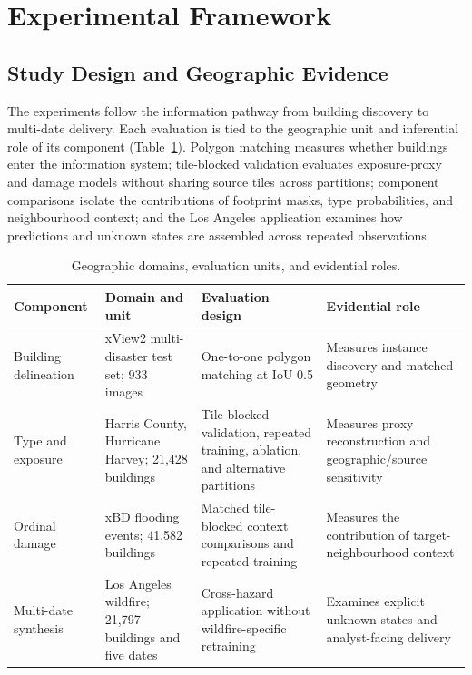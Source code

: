 \section{Experimental Framework}
\label{sec:experiments}

\subsection{Study Design and Geographic Evidence}
\label{sec:exp_scope}

The experiments follow the information pathway from building discovery to multi-date delivery. Each evaluation is tied to the geographic unit and inferential role of its component (Table~\ref{tab:evidence_scope}). Polygon matching measures whether buildings enter the information system; tile-blocked validation evaluates exposure-proxy and damage models without sharing source tiles across partitions; component comparisons isolate the contributions of footprint masks, type probabilities, and neighbourhood context; and the Los Angeles application examines how predictions and unknown states are assembled across repeated observations.

\begin{table}[h!]
\centering
\caption{Geographic domains, evaluation units, and evidential roles.}
\label{tab:evidence_scope}
\scriptsize
\setlength{\tabcolsep}{4pt}
\begin{tabularx}{\textwidth}{>{\raggedright\arraybackslash}p{2.3cm}>{\raggedright\arraybackslash}p{3.6cm}>{\raggedright\arraybackslash}p{4.1cm}>{\raggedright\arraybackslash}X}
\toprule
Component & Domain and unit & Evaluation design & Evidential role \\
\midrule
Building delineation & xView2 multi-disaster test set; 933 images & One-to-one polygon matching at IoU 0.5 & Measures instance discovery and matched geometry \\
Type and exposure & Harris County, Hurricane Harvey; 21,428 buildings & Tile-blocked validation, repeated training, ablation, and alternative partitions & Measures proxy reconstruction and geographic/source sensitivity \\
Ordinal damage & xBD flooding events; 41,582 buildings & Matched tile-blocked context comparisons and repeated training & Measures the contribution of target-neighbourhood context \\
Multi-date synthesis & Los Angeles wildfire; 21,797 buildings and five dates & Cross-hazard application without wildfire-specific retraining & Examines explicit unknown states and analyst-facing delivery \\
\bottomrule
\end{tabularx}
\end{table}

